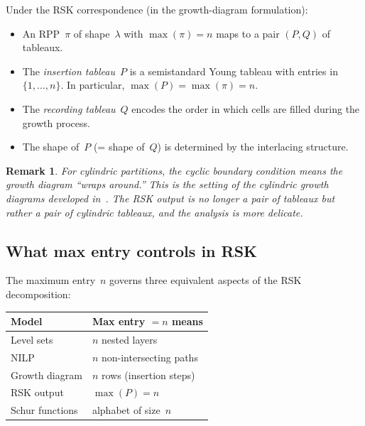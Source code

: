 \documentclass[11pt]{article}
\newtheorem{remark}[theorem]{Remark}
\begin{document}
Under the RSK correspondence (in the growth-diagram
formulation):

\begin{itemize}
  \item An RPP~$\pi$ of shape~$\lambda$ with $\max(\pi) = n$
    maps to a pair $(P, Q)$ of tableaux.
  \item The \emph{insertion tableau}~$P$ is a semistandard
    Young tableau with entries in $\{1, \ldots, n\}$.
    In particular, $\max(P) = \max(\pi) = n$.
  \item The \emph{recording tableau}~$Q$ encodes the order
    in which cells are filled during the growth process.
  \item The shape of~$P$ (= shape of~$Q$) is determined by
    the interlacing structure.
\end{itemize}

\begin{remark}
For cylindric partitions, the cyclic boundary condition means
the growth diagram ``wraps around.'' This is the setting of
the cylindric growth diagrams developed
in~\cite{langer-thesis,langer-part-II}.
The RSK output is no longer a pair of tableaux but rather
a pair of \emph{cylindric tableaux}, and the analysis
is more delicate.
\end{remark}

\subsection{What max entry controls in RSK}

The maximum entry~$n$ governs three equivalent aspects of
the RSK decomposition:

\begin{center}
\begin{tabular}{l|l}
  \textbf{Model} & \textbf{Max entry $= n$ means} \\
  \hline
  Level sets & $n$ nested layers \\
  NILP & $n$ non-intersecting paths \\
  Growth diagram & $n$ rows (insertion steps) \\
  RSK output & $\max(P) = n$ \\
  Schur functions & alphabet of size~$n$
\end{tabular}
\end{center}
\end{document}
